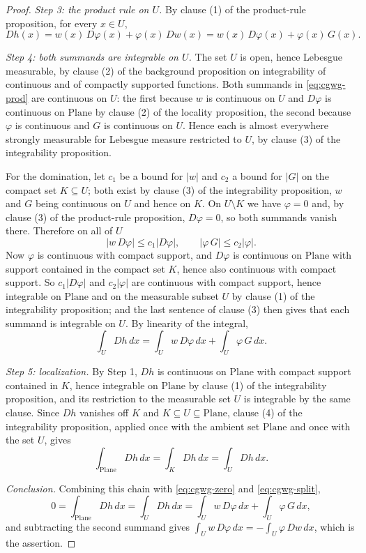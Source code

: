 \begin{proof}
\medskip\noindent\emph{Step 3: the product rule on $U$.}
By clause (1) of the product-rule proposition, for every $x\in U$,
\begin{equation}\label{eq:cgwg-prod}
  Dh(x)=w(x)\,D\varphi(x)+\varphi(x)\,Dw(x)=w(x)\,D\varphi(x)+\varphi(x)\,G(x).
\end{equation}

\medskip\noindent\emph{Step 4: both summands are integrable on $U$.}
The set $U$ is open, hence Lebesgue measurable, by clause (2) of the background proposition on
integrability of continuous and of compactly supported functions.  Both summands in
\eqref{eq:cgwg-prod} are continuous on $U$: the first because $w$ is continuous on $U$ and
$D\varphi$ is continuous on $\mathrm{Plane}$ by clause (2) of the locality proposition, the
second because $\varphi$ is continuous and $G$ is continuous on $U$.  Hence each is almost
everywhere strongly measurable for Lebesgue measure restricted to $U$, by clause (3) of the
integrability proposition.

For the domination, let $c_1$ be a bound for $\lvert w\rvert$ and $c_2$ a bound for
$\lvert G\rvert$ on the compact set $K\subseteq U$; both exist by clause (3) of the
integrability proposition, $w$ and $G$ being continuous on $U$ and hence on $K$.  On
$U\setminus K$ we have $\varphi=0$ and, by clause (3) of the product-rule proposition,
$D\varphi=0$, so both summands vanish there.  Therefore on all of $U$
\[
  \lvert w\,D\varphi\rvert\le c_1\lvert D\varphi\rvert,
  \qquad
  \lvert\varphi\,G\rvert\le c_2\lvert\varphi\rvert .
\]
Now $\varphi$ is continuous with compact support, and $D\varphi$ is continuous on
$\mathrm{Plane}$ with support contained in the compact set $K$, hence also continuous with
compact support.  So $c_1\lvert D\varphi\rvert$ and $c_2\lvert\varphi\rvert$ are continuous
with compact support, hence integrable on $\mathrm{Plane}$ and on the measurable subset $U$ by
clause (1) of the integrability proposition; and the last sentence of clause (3) then gives
that each summand is integrable on $U$.  By linearity of the integral,
\begin{equation}\label{eq:cgwg-split}
  \int_UDh\,dx=\int_Uw\,D\varphi\,dx+\int_U\varphi\,G\,dx .
\end{equation}

\medskip\noindent\emph{Step 5: localization.}
By Step 1, $Dh$ is continuous on $\mathrm{Plane}$ with compact support contained in $K$, hence
integrable on $\mathrm{Plane}$ by clause (1) of the integrability proposition, and its
restriction to the measurable set $U$ is integrable by the same clause.  Since $Dh$ vanishes
off $K$ and $K\subseteq U\subseteq\mathrm{Plane}$, clause (4) of the integrability proposition,
applied once with the ambient set $\mathrm{Plane}$ and once with the set $U$, gives
\[
  \int_{\mathrm{Plane}}Dh\,dx=\int_KDh\,dx=\int_UDh\,dx .
\]

\medskip\noindent\emph{Conclusion.}
Combining this chain with \eqref{eq:cgwg-zero} and \eqref{eq:cgwg-split},
\[
  0=\int_{\mathrm{Plane}}Dh\,dx=\int_UDh\,dx
   =\int_Uw\,D\varphi\,dx+\int_U\varphi\,G\,dx ,
\]
and subtracting the second summand gives
$\int_Uw\,D\varphi\,dx=-\int_U\varphi\,Dw\,dx$, which is the assertion.
\end{proof}
